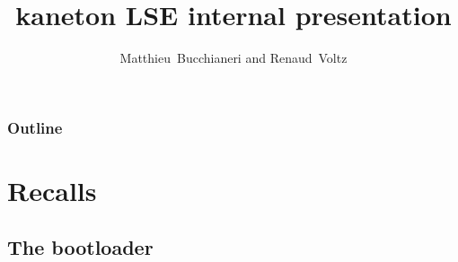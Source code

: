 
%
%



%
%

\title{kaneton LSE internal presentation}

%
%

\author
{
  Matthieu~Bucchianeri and Renaud~Voltz
}

%
%

%
%



%
%

\begin{frame}
  \titlepage

  \begin{center}
    \logos
  \end{center}
\end{frame}

%
%

\begin{frame}
  \frametitle{Outline}
  \tableofcontents
\end{frame}

%
%

\section{Recalls}

%
%

\subsection{The bootloader}


